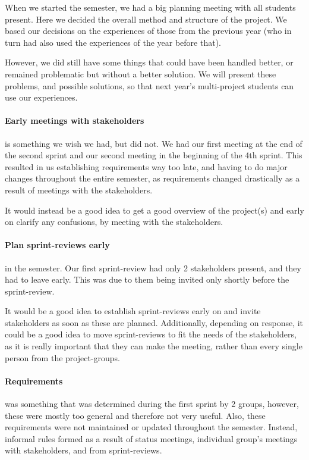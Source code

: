 When we started the semester, we had a big planning meeting with all students present.
Here we decided the overall method and structure of the project.
We based our decisions on the experiences of those from the previous year (who in turn had also used the experiences of the year before that).

However, we did still have some things that could have been handled better, or remained problematic but without a better solution.
We will present these problems, and possible solutions, so that next year's multi-project students can use our experiences.

\paragraph{Early meetings with stakeholders} is something we wish we had, but did not.
We had our first meeting at the end of the second sprint and our second meeting in the beginning of the 4th sprint.
This resulted in us establishing requirements way too late, and having to do major changes throughout the entire semester, as requirements changed drastically as a result of meetings with the stakeholders.

It would instead be a good idea to get a good overview of the project(s) and early on clarify any confusions, by meeting with the stakeholders.

\paragraph{Plan sprint-reviews early} in the semester.
Our first sprint-review had only 2 stakeholders present, and they had to leave early.
This was due to them being invited only shortly before the sprint-review.

It would be a good idea to establish sprint-reviews early on and invite stakeholders as soon as these are planned.
Additionally, depending on response, it could be a good idea to move sprint-reviews to fit the needs of the stakeholders, as it is really important that they can make the meeting, rather than every single person from the project-groups.

\paragraph{Requirements} was something that was determined during the first sprint by 2 groups, however, these were mostly too general and therefore not very useful.
Also, these requirements were not maintained or updated throughout the semester.
Instead, informal rules formed as a result of status meetings, individual group's meetings with stakeholders, and from sprint-reviews.

